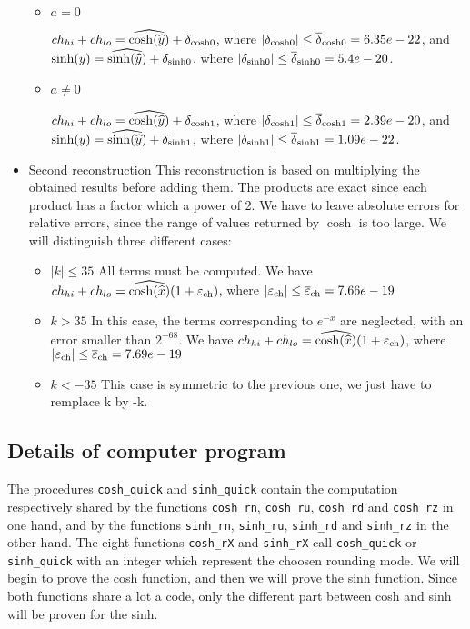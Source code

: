 \begin{itemize}
\begin{itemize}
\item{$a = 0$}

  $ch_{hi}+ch_{lo} = \widehat{\cosh(\widehat{y})} + \delta_{\mathrm{cosh0}}$, where $|\delta_{\mathrm{cosh0}}| \leq {\overline{\delta}}_{\mathrm{cosh0}} = 6.35e-22$, and 
  $\sinh(y) = \widehat{\sinh(\widehat{y})} + \delta_{\mathrm{sinh0}}$, where $|\delta_{\mathrm{sinh0}}| \leq  {\overline{\delta}}_{\mathrm{sinh0}} = 5.4e-20$.

\item{$a \neq 0$}

  $ch_{hi}+ch_{lo} = \widehat{\cosh(\widehat{y})} + \delta_{\mathrm{cosh1}}$, where $|\delta_{\mathrm{cosh1}}| \leq {\overline{\delta}}_{\mathrm{cosh1}} = 2.39e-20$, and 
  $\sinh(y) = \widehat{\sinh(\widehat{y})} + \delta_{\mathrm{sinh1}}$, where $|\delta_{\mathrm{sinh1}}| \leq  {\overline{\delta}}_{\mathrm{sinh1}} = 1.09e-22$.
\end{itemize}

\item{Second reconstruction} This reconstruction is based on
  multiplying the obtained results before adding them. The products
  are exact since each product has a factor which a power of 2.  We
  have to leave absolute errors for relative errors, since the range
  of values returned by $\cosh$ is too large.  We will distinguish three
  different cases:
\begin{itemize}
\item{$|k| \leq 35$}
  All terms must be computed. We have $ch_{hi} + ch_{lo} = \widehat{\cosh(\widehat{x})}(1+\varepsilon_{\mathrm{ch}})$, where $|\varepsilon_{\mathrm{ch}}| \leq {\overline{\varepsilon}}_{\mathrm{ch}} = 7.66e-19$
\item{$k > 35$}
  In this case, the terms corresponding to $e^{-x}$  are neglected, with an error smaller than $2^{-68}$. We have $ch_{hi} + ch_{lo} = \widehat{\cosh(\widehat{x})}(1+\varepsilon_{\mathrm{ch}})$, where $|\varepsilon_{\mathrm{ch}}| \leq {\overline{\varepsilon}}_{\mathrm{ch}} = 7.69e-19$
\item{$k < -35$}
  This case is symmetric to the previous one, we just have to remplace k by -k.
\end{itemize}
\end{itemize} 

\subsection{Details of computer program}

The procedures \texttt{cosh\_quick} and \texttt{sinh\_quick} contain the computation respectively shared by the 
functions \texttt{cosh\_rn}, \texttt{cosh\_ru}, \texttt{cosh\_rd} and \texttt{cosh\_rz} in one hand, and by the 
functions \texttt{sinh\_rn}, \texttt{sinh\_ru}, \texttt{sinh\_rd} and \texttt{sinh\_rz} in the other hand.
The eight functions \texttt{cosh\_rX} and \texttt{sinh\_rX} call \texttt{cosh\_quick} or \texttt{sinh\_quick} with an integer which represent the choosen rounding mode.
We will begin to prove the cosh function, and then we will prove the sinh function. Since both functions share a lot a code, only the different part between cosh and sinh will be proven for the sinh. 


